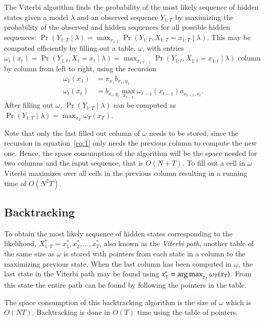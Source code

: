 The Viterbi algorithm finds the probability of the most likely sequence of
hidden states given a model $\lambda$ and an observed sequence $Y_{1:T}$ by
maximizing the probability of the observed and hidden sequences for all
possible hidden sequences: $\Pr(Y_{1:T} \mid \lambda) = \max_{x_{1:T}}
\Pr(Y_{1:T}, X_{1:T} = x_{1:T} \mid \lambda)$. This may be computed efficiently
by filling out a table, $\omega$, with entries $\omega_t(x_t) = \Pr(Y_{1:t},
X_t = x_t \mid \lambda) = \max_{x_{1:t-1}} \Pr(Y_{1:t}, X_{1:t} = x_{1:t} \mid
\lambda)$ column by column from left to right, using the recursion
\begin{equation}
  \label{eq:1}
  \begin{aligned}
    \omega_1(x_1) &= \pi_{x_1} b_{x_1, y_1} \\
    \omega_t(x_t) &= b_{x_t, y_t} \max_{x_{t - 1}} \omega_{t - 1}(x_{t - 1})
    a_{x_{t - 1}, x_t}.
  \end{aligned}
\end{equation}
After filling out $\omega$, $\Pr(Y_{1:T} \mid \lambda)$ can be computed as
$\Pr(Y_{1:T} \mid \lambda) = \max_{x_T} \omega_T(x_T)$.

Note that only the last filled out column of $\omega$ needs to be stored, since
the recursion in equation~\eqref{eq:1} only needs the previous column to
compute the new one. Hence, the space consumption of the algorithm will be the
space needed for two columns and the input sequence, that is $O(N + T)$. To
fill out a cell in $\omega$ Viterbi maximizes over all cells in the previous
column resulting in a running time of $O\left(N^2 T \right)$.

\subsection{Backtracking}
\label{sec:backtracking-1}

To obtain the most likely sequence of hidden states corresponding to the
likelihood, $X_{1:T}^* = x_1^*, x_2^*, \dots, x_T^*$, also known as the
\emph{Viterbi path}, another table of the same size as $\omega$ is stored with
pointers from each state in a column to the maximizing previous state. When the
last column has been computed in $\omega$, the last state in the Viterbi path
may be found using $x_T^* = \operatorname*{arg\,max}_{x_T} \omega_T(x_T)$. From this state the entire
path can be found by following the pointers in the table.

The space consumption of this backtracking algorithm is the size of $\omega$
which is $O(N T)$. Backtracking is done in $O(T)$ time using the table of pointers.

